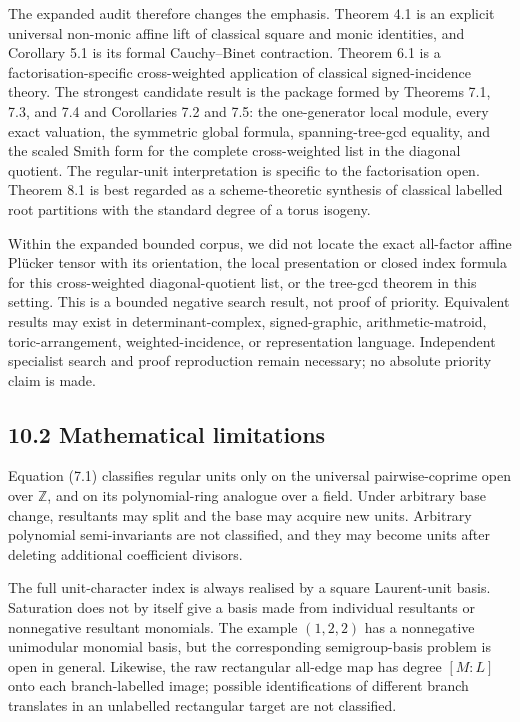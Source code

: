 \documentclass[
  11pt,
  a4paper,
]{article}
\begin{document}
The expanded audit therefore changes the emphasis. Theorem 4.1 is an
explicit universal non-monic affine lift of classical square and monic
identities, and Corollary 5.1 is its formal Cauchy--Binet contraction.
Theorem 6.1 is a factorisation-specific cross-weighted application of
classical signed-incidence theory. The strongest candidate result is the
package formed by Theorems 7.1, 7.3, and 7.4 and Corollaries 7.2 and
7.5: the one-generator local module, every exact valuation, the
symmetric global formula, spanning-tree-gcd equality, and the scaled
Smith form for the complete cross-weighted list in the diagonal
quotient. The regular-unit interpretation is specific to the
factorisation open. Theorem 8.1 is best regarded as a scheme-theoretic
synthesis of classical labelled root partitions with the standard degree
of a torus isogeny.

Within the expanded bounded corpus, we did not locate the exact
all-factor affine Plücker tensor with its orientation, the local
presentation or closed index formula for this cross-weighted
diagonal-quotient list, or the tree-gcd theorem in this setting. This is
a bounded negative search result, not proof of priority. Equivalent
results may exist in determinant-complex, signed-graphic,
arithmetic-matroid, toric-arrangement, weighted-incidence, or
representation language. Independent specialist search and proof
reproduction remain necessary; no absolute priority claim is made.

\subsection{10.2 Mathematical
limitations}\label{mathematical-limitations}

Equation (7.1) classifies regular units only on the universal
pairwise-coprime open over \(\mathbb Z\), and on its polynomial-ring
analogue over a field. Under arbitrary base change, resultants may split
and the base may acquire new units. Arbitrary polynomial semi-invariants
are not classified, and they may become units after deleting additional
coefficient divisors.

The full unit-character index is always realised by a square
Laurent-unit basis. Saturation does not by itself give a basis made from
individual resultants or nonnegative resultant monomials. The example
\((1,2,2)\) has a nonnegative unimodular monomial basis, but the
corresponding semigroup-basis problem is open in general. Likewise, the
raw rectangular all-edge map has degree \([M:L]\) onto each
branch-labelled image; possible identifications of different branch
translates in an unlabelled rectangular target are not classified.
\end{document}

